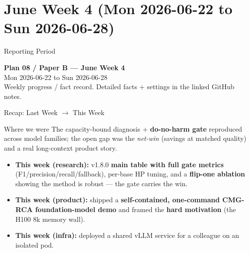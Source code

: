 
\section{June Week 4 (Mon 2026-06-22 to Sun 2026-06-28)}

\begin{frame}{Reporting Period}
  \begin{center}
    \textbf{Plan 08 / Paper B --- June Week 4} \\[0.3em]
    \small Mon 2026-06-22 to Sun 2026-06-28 \\
    \scriptsize Weekly progress / fact record. Detailed facts + settings in the linked GitHub notes.
  \end{center}
\end{frame}

\begin{frame}{Recap: Last Week $\to$ This Week}
  \begin{block}{Where we were}
    The capacity-bound diagnosis + \textbf{do-no-harm gate} reproduced across model families; the open gap was
    the \emph{net-win} (savings at matched quality) and a real long-context product story.
  \end{block}
  \begin{itemize}
    \item \textbf{This week (research):} v1.8.0 \textbf{main table with full gate metrics} (F1/precision/recall/fallback),
      per-base HP tuning, and a \textbf{flip-one ablation} showing the method is robust --- the gate carries the win.
    \item \textbf{This week (product):} shipped a \textbf{self-contained, one-command CMG-RCA foundation-model demo}
      and framed the \textbf{hard motivation} (the H100 8k memory wall).
    \item \textbf{This week (infra):} deployed a shared vLLM service for a colleague on an isolated pod.
  \end{itemize}
\end{frame}


